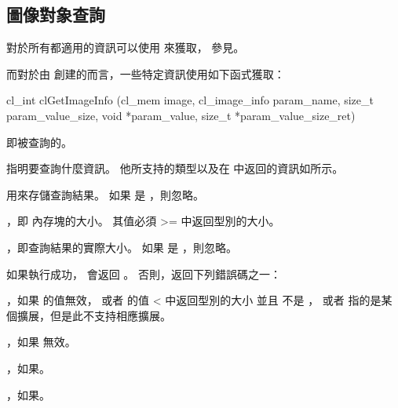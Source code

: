 \subsection{圖像對象查詢}

對於所有都適用的資訊可以使用  來獲取，
參見\insection[memObjQuery]。

而對於由  創建的而言，一些特定資訊使用如下函式獲取：


\startCLFUNC
cl_int clGetImageInfo (cl_mem image,
			cl_image_info param_name,
			size_t param_value_size,
			void *param_value,
			size_t *param_value_size_ret)
\stopCLFUNC

 即被查詢的。

 指明要查詢什麼資訊。
他所支持的類型以及在  中返回的資訊如所示。

 用來存儲查詢結果。
如果  是 ，則忽略。

，即  內存塊的大小。
其值必須 >= 中返回型別的大小。

，即查詢結果的實際大小。
如果  是 ，則忽略。

如果執行成功，  會返回 。
否則，返回下列錯誤碼之一：
\startigBase
\item {}，如果  的值無效，
或者  的值 < 中返回型別的大小
並且  不是 ，
或者  指的是某個擴展，但是此不支持相應擴展。

\item {}，如果  無效。

\item {}，如果\scdevfailres。
\item {}，如果\schostfailres。
\stopigBase

{}

